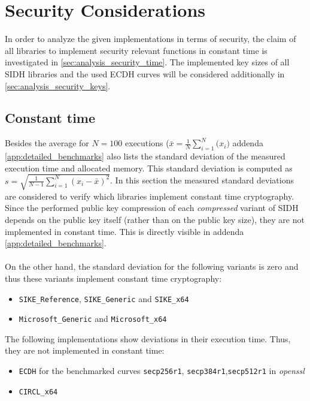 \section{Security Considerations}\label{sec:analysis_security}

In order to analyze the given implementations in terms of security, the claim of all libraries to implement security relevant functions in constant time is investigated in \autoref{sec:analysis_security_time}. The implemented key sizes of all \gls{SIDH} libraries and the used \gls{ECDH} curves will be considered additionally in \autoref{sec:analysis_security_keys}.

\subsection{Constant time}\label{sec:analysis_security_time}
Besides the average for $N=100$ executions ($\bar{x}=\frac{1}{N}\sum_{i=1}^N{(x_i})$ addenda \ref{app:detailed_benchmarks} also lists the standard deviation of the measured execution time and allocated memory. This standard deviation is computed as $s=\sqrt{\frac{1}{N-1}\sum_{i=1}^N(x_i-\bar{x})^2}$. In this section the measured standard deviations are considered to verify which libraries implement constant time cryptography.\\
Since the performed public key compression of each \textit{compressed} variant of \gls{SIDH} depends on the public key itself (rather than on the public key size), they are not implemented in constant time. This is directly visible in  addenda \ref{app:detailed_benchmarks}.\\\\
On the other hand, the standard deviation for the following variants is zero and thus these variants implement constant time cryptography:
\begin{itemize}
\item \texttt{SIKE\_Reference}, \texttt{SIKE\_Generic} and \texttt{SIKE\_x64}
\item \texttt{Microsoft\_Generic} and \texttt{Microsoft\_x64}
\end{itemize}
The following implementations show deviations in their execution time. Thus, they are not implemented in constant time:

\begin{itemize}
\item \texttt{\gls{ECDH}} for the benchmarked curves \texttt{secp256r1},  \texttt{secp384r1},\texttt{secp512r1} in \textit{\gls{openssl}}
\item \texttt{\gls{CIRCL}\_x64}
\end{itemize}

